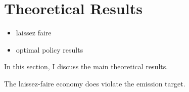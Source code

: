 \section{Theoretical Results}\label{sec:theory}
\begin{itemize}
	\item laissez faire
	\item optimal policy results
\end{itemize}

In this section, I discuss the main theoretical results. 

The laissez-faire economy does violate the emission target. 